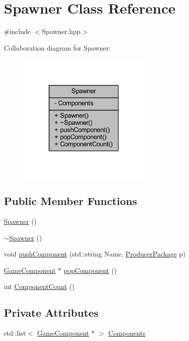 \hypertarget{class_spawner}{\section{Spawner Class Reference}
\label{class_spawner}
}


{\ttfamily \#include $<$Spawner.\-hpp$>$}



Collaboration diagram for Spawner\-:\nopagebreak
\begin{figure}[H]
\begin{center}
\leavevmode
\includegraphics[width=187pt]{class_spawner__coll__graph}
\end{center}
\end{figure}
\subsection*{Public Member Functions}
\begin{DoxyCompactItemize}
\item 
\hyperlink{class_spawner_a3e3aa3ccff73556625359e75f64d0dd0}{Spawner} ()
\item 
\hyperlink{class_spawner_a59d8e3d4d6dc6c25f38ce5d4fcc5e8e6}{$\sim$\-Spawner} ()
\item 
void \hyperlink{class_spawner_ae2e88e63fbb94df841800bd239d1a348}{push\-Component} (std\-::string Name, \hyperlink{class_producer_package}{Producer\-Package} p)
\item 
\hyperlink{class_game_component}{Game\-Component} $\ast$ \hyperlink{class_spawner_a2cb984bed31cef93edcb9dcfc27f47d0}{pop\-Component} ()
\item 
int \hyperlink{class_spawner_a9b6caf4f8e980acd1537050792ab8583}{Component\-Count} ()
\end{DoxyCompactItemize}
\subsection*{Private Attributes}
\begin{DoxyCompactItemize}
\item 
std\-::list$<$ \hyperlink{class_game_component}{Game\-Component} $\ast$ $>$ \hyperlink{class_spawner_ae5e316957ac1574347ba80bac3866976}{Components}
\end{DoxyCompactItemize}


